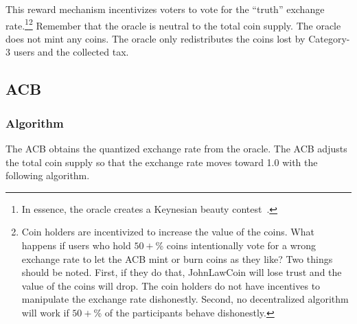 \documentclass[dvipdfmx,a4paper]{article}
\begin{document}
This reward mechanism incentivizes voters to vote for the ``truth'' exchange rate.\footnote{In essence, the oracle creates a Keynesian beauty contest~\cite{gao2008keynesian}.}\footnote{Coin holders are incentivized to increase the value of the coins. What happens if users who hold $50+$\% coins intentionally vote for a wrong exchange rate to let the ACB mint or burn coins as they like? Two things should be noted. First, if they do that, JohnLawCoin will lose trust and the value of the coins will drop. The coin holders do not have incentives to manipulate the exchange rate dishonestly. Second, no decentralized algorithm will work if $50+$\% of the participants behave dishonestly.} Remember that the oracle is neutral to the total coin supply. The oracle does not mint any coins. The oracle only redistributes the coins lost by Category-3 users and the collected tax.

\subsection{ACB}

\subsubsection{Algorithm}

The ACB obtains the quantized exchange rate from the oracle. The ACB adjusts the total coin supply so that the exchange rate moves toward 1.0 with the following algorithm.
\end{document}
